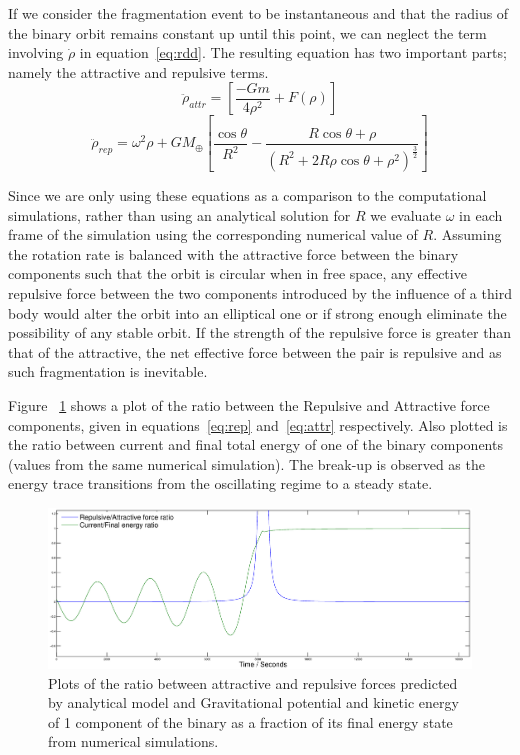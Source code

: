 \documentclass[letterpaper, preprint, paper,11pt]{AAS}	%
\begin{document}
If we consider the fragmentation event to be instantaneous and that the radius of the binary orbit remains constant up until this point, we can neglect the term involving $\dot{\rho}$ in equation~\ref{eq:rdd}. The resulting equation has two important parts; namely the attractive and repulsive terms.
\begin{equation} \label{eq:attr}
\ddot{\rho}_{attr} = \left[\frac{-Gm}{4\rho^{2}}+F(\rho)\right]
\end{equation}
\begin{equation} \label{eq:rep}
\ddot{\rho}_{rep} = \omega^{2}\rho+{GM_\oplus}\left[\frac{\cos\theta}{R^{2}}-\frac{R\cos\theta+\rho}{(R^{2}+2R\rho\cos\theta+\rho^{2})^\frac{3}{2}}\right]
\end{equation}

Since we are only using these equations as a comparison to the computational simulations, rather than using an analytical solution for $R$ we evaluate $\omega$ in each frame of the simulation using the corresponding numerical value of $R$. Assuming the rotation rate is balanced with the attractive force between the binary components such that the orbit is circular when in free space, any effective repulsive force between the two components introduced by the influence of a third body would alter the orbit into an elliptical one or if strong enough eliminate the possibility of any stable orbit. If the strength of the repulsive force is greater than that of the attractive, the net effective force between the pair is repulsive and as such fragmentation is inevitable. 

Figure ~\ref{fig:Analy} shows a plot of the ratio between the Repulsive and Attractive force components, given in equations~\ref{eq:rep} and~\ref{eq:attr} respectively. Also plotted is the ratio between current and final total energy of one of the binary components (values from the same numerical simulation). The break-up is observed as the energy trace transitions from the oscillating regime to a steady state.
\begin{figure}[H]
\centering
\centerline{\includegraphics[width=1.2\textwidth]{binary_analy.eps}} 
\caption{Plots of the ratio between attractive and repulsive forces predicted by analytical model and Gravitational potential and kinetic energy of 1 component of the binary as a fraction of its final energy state from numerical simulations.} 
\label{fig:Analy}
\end{figure} 
\end{document}
